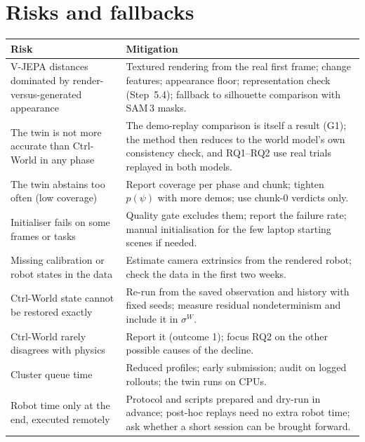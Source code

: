 \section{Risks and fallbacks}\label{method:sec:risks}
\begin{center}\small
\begin{tabularx}{\linewidth}{@{}>{\raggedright\arraybackslash}p{5.2cm}>{\raggedright\arraybackslash}X@{}}
\toprule
\textbf{Risk} & \textbf{Mitigation}\\
\midrule
V-JEPA distances dominated by render-versus-generated appearance & Textured rendering from the real first frame; change features; appearance floor; representation check (Step~5.4); fallback to silhouette comparison with SAM\,3 masks.\\
The twin is not more accurate than Ctrl-World in any phase & The demo-replay comparison is itself a result (G1); the method then reduces to the world model's own consistency check, and RQ1--RQ2 use real trials replayed in both models.\\
The twin abstains too often (low coverage) & Report coverage per phase and chunk; tighten $p(\psi)$ with more demos; use chunk-0 verdicts only.\\
Initialiser fails on some frames or tasks & Quality gate excludes them; report the failure rate; manual initialisation for the few laptop starting scenes if needed.\\
Missing calibration or robot states in the data & Estimate camera extrinsics from the rendered robot; check the data in the first two weeks.\\
Ctrl-World state cannot be restored exactly & Re-run from the saved observation and history with fixed seeds; measure residual nondeterminism and include it in $\sigma^W$.\\
Ctrl-World rarely disagrees with physics & Report it (outcome 1); focus RQ2 on the other possible causes of the decline.\\
Cluster queue time & Reduced profiles; early submission; audit on logged rollouts; the twin runs on CPUs.\\
Robot time only at the end, executed remotely & Protocol and scripts prepared and dry-run in advance; post-hoc replays need no extra robot time; ask whether a short session can be brought forward.\\
\bottomrule
\end{tabularx}
\end{center}

